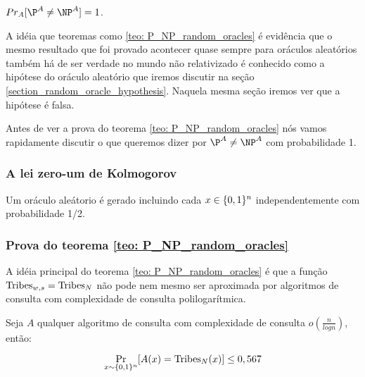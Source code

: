 \begin{teo} \label{teo: P_NP_random_oracles}

$Pr_{A}[\P^{A} \neq \NP^{A}] = 1$.

\end{teo}

A idéia que teoremas como \ref{teo: P_NP_random_oracles} é evidência que o mesmo resultado que foi provado acontecer quase sempre para oráculos aleatórios também há de ser verdade no mundo não relativizado é conhecido como a hipótese do oráculo aleatório que iremos discutir na seção \ref{section_random_oracle_hypothesis}. Naquela mesma seção iremos ver que a hipótese é falsa.

Antes de ver a prova do teorema \ref{teo: P_NP_random_oracles} nós vamos rapidamente discutir o que queremos dizer por $\P^{A} \neq \NP^{A}$ com probabilidade 1.

\subsubsection{A lei zero-um de Kolmogorov}

Um oráculo aleátorio é gerado incluindo cada $x \in \{0, 1\}^{n}$ independentemente com probabilidade 1/2. 


\subsubsection{Prova do teorema \ref{teo: P_NP_random_oracles}}

A idéia principal do teorema \ref{teo: P_NP_random_oracles} é que a função $\text{Tribes}_{w, s} = \text{Tribes}_{N}$ não pode nem mesmo ser aproximada por algoritmos de consulta com complexidade de consulta polilogarítmica.

\begin{prop} \label{prop: tribes_inaproximability}

Seja $A$ qualquer algoritmo de consulta com complexidade de consulta $o(\frac{n}{logn})$, então:

\begin{equation*}
    \Pr_{x \sim \{0, 1\}^{n}}[A(x) = \text{Tribes}_{N}(x)] \leq 0,567 
\end{equation*}

\end{prop}

